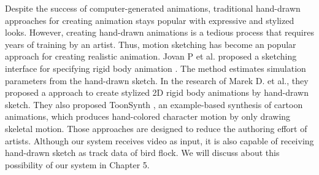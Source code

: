 Despite the success of computer-generated animations, traditional hand-drawn approaches for creating animation stays popular with  expressive and stylized looks. However, creating hand-drawn animations is a tedious process that requires years of training by an artist. Thus, motion sketching has become an popular approach for creating realistic animation. Jovan P et al. proposed a sketching interface for specifying rigid body animation \cite{MoSketch}. The method estimates simulation parameters from the hand-drawn sketch. In the research of Marek D. et al., they proposed a approach to create stylized 2D rigid body animations by hand-drawn sketch\cite{Rigid}. They also proposed ToonSynth \cite{ToonSynth}, an example-based synthesis of cartoon animations, which produces hand-colored  character motion by only drawing skeletal motion. Those approaches are designed to reduce the authoring effort of artists.  Although our system receives video as input, it is also capable of receiving hand-drawn sketch as track data of bird flock. We will discuss about this possibility of our system in Chapter 5.